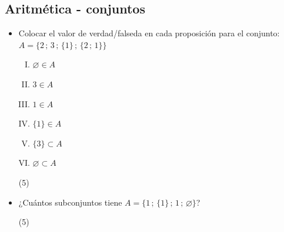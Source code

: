 \documentclass[11pt, twocolumn, landscape, a4paper]{article}
\begin{document}
\subsection*{Aritmética - conjuntos}
\begin{itemize}
\item{Colocar el valor de verdad/falseda en cada proposición para el conjunto:
$A = \{2\,;\,3\,;\,\{1\}\,;\,\{2\,;\,1\}\}$
\begin{enumerate}[I.]
\item{$\varnothing \in A$}
\item{$3 \in A$}
\item{$1 \in A$}
\item{$\{1\} \in A$}
\item{$\{3\} \subset A$}
\item{$\varnothing \subset A$}
\end{enumerate}
\begin{tasks}(5)
\end{tasks}
}
\item{¿Cuántos subconjuntos tiene $A = \{1\,;\,\{1\}\,;\,1\,;\,\varnothing\}$?
\begin{tasks}(5)
\end{tasks}
}
\end{itemize}
\end{document}
